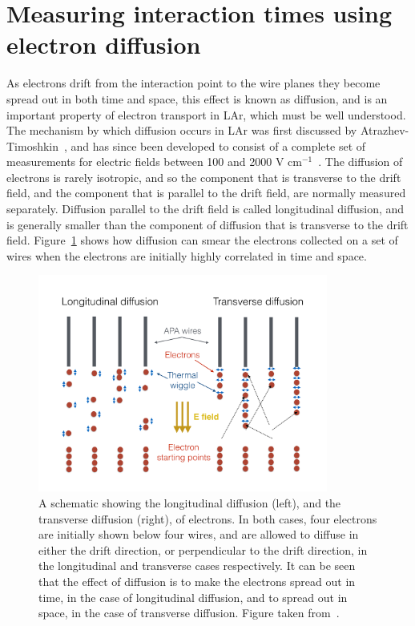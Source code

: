 \section{Measuring interaction times using electron diffusion}  \label{sec:DiffusionAnalysis}%
As electrons drift from the interaction point to the wire planes they become spread out in both time and space, this effect is known as diffusion, and is an important property of electron transport in LAr, which must be well understood. The mechanism by which diffusion occurs in LAr was first discussed by Atrazhev-Timoshkin~\citep{Atrazhev-Timoshkin}, and has since been developed to consist of a complete set of measurements for electric fields between 100 and 2000 V cm$^{-1}$~\citep{Li:2015rqa}. The diffusion of electrons is rarely isotropic, and so the component that is transverse to the drift field, and the component that is parallel to the drift field, are normally measured separately. Diffusion parallel to the drift field is called longitudinal diffusion, and is generally smaller than the component of diffusion that is transverse to the drift field. Figure~\ref{fig:DomDiffSchem} shows how diffusion can smear the electrons collected on a set of wires when the electrons are initially highly correlated in time and space. \\

\begin{figure}[h!]
  \centering
  \includegraphics[width=0.85\textwidth]{DiffusionSchematic}
  \caption[Schematic showing the process of diffusion]
          {A schematic showing the longitudinal diffusion (left), and the transverse diffusion (right), of electrons. In both cases, four electrons are initially shown below four wires, and are allowed to diffuse in either the drift direction, or perpendicular to the drift direction, in the longitudinal and transverse cases respectively. It can be seen that the effect of diffusion is to make the electrons spread out in time, in the case of longitudinal diffusion, and to spread out in space, in the case of transverse diffusion. Figure taken from~\citep{DomSeptMeeting}.}
  \label{fig:DomDiffSchem}
\end{figure}


